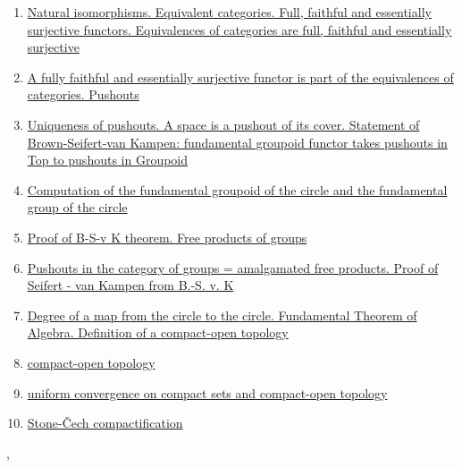 \documentclass[11pt]{article}
\renewcommand{\today}{\shortmonthname[\the\month] \the \day,  \the\year}
\begin{document}
\begin{enumerate}
	\item \href{https://mp.weixin.qq.com/s/wboTxmkWpOYL6gSbEyQ4TQ}{Natural isomorphisms. Equivalent categories. Full, faithful and essentially surjective functors. Equivalences of categories are full, faithful and essentially surjective}	%
	\item \href{https://mp.weixin.qq.com/s/pmz6I04CYzk1m8z4Qq-mQw}{A fully faithful and essentially surjective functor is part of the equivalences of categories. Pushouts}	%
	\item \href{https://mp.weixin.qq.com/s/lqoX-KpQ-gzSSxem6gNTMA}{Uniqueness of pushouts. A space is a pushout of its cover. Statement of Brown-Seifert-van Kampen: fundamental groupoid functor takes pushouts in Top to pushouts in Groupoid}	%
	\item \href{https://mp.weixin.qq.com/s/YT4krGWMkAYgfBoOtHYyFg}{Computation of the fundamental groupoid of the circle and the fundamental group of the circle}	%
	\item \href{https://mp.weixin.qq.com/s/3SoNZ3pUF5mUY_T4Wg7Y2Q}{Proof of B-S-v K theorem. Free products of groups}	%
	\item \href{https://mp.weixin.qq.com/s/9O7I8mpcbcWjHDxs8-XcTA}{Pushouts in the category of groups = amalgamated free products. Proof of Seifert - van Kampen from B.-S. v. K}	%
	\item \href{https://mp.weixin.qq.com/s/TrKmVo0PtMxNBmNLlsDuMg}{Degree of a map from the circle to the circle. Fundamental Theorem of Algebra. Definition of a compact-open topology}	%
	\item \href{https://mp.weixin.qq.com/s/q1OoRqVMOpQAsaC6jJikIg}{compact-open topology}	%
	\item \href{https://mp.weixin.qq.com/s/3jOl4G36j-zir5uFdaGfiw}{uniform convergence on compact sets and compact-open topology}	%
	\item \href{https://mp.weixin.qq.com/s/78e7FVucqSvMq3IQtfQH6w}{Stone-\v{C}ech compactification}	%
\end{enumerate}





%
\begin{flushright}
	\tiny \today 
\end{flushright}
\end{document}
